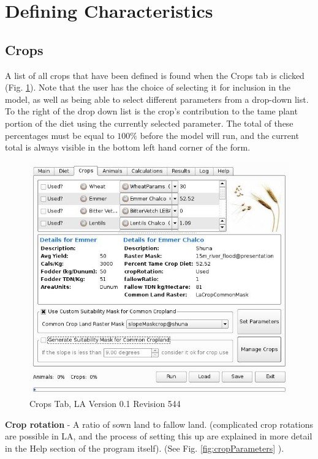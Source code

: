 \section{Defining Characteristics}
 \subsection{Crops}
    A list of all crops that have been defined is found when the Crops tab is
    clicked (Fig. \ref{fig:crop}).  Note that the user has the choice of
    selecting it for inclusion in the model, as well as being able to select
    different parameters from a drop-down list.  To the right of the drop down
    list is the crop's contribution to the tame plant portion of the diet using
    the currently selected parameter.  The total of these percentages must be
    equal to $100\%$ before the model will run, and the current total is always
    visible in the bottom left hand corner of the form.

    \begin{figure}[htbp]
        \includegraphics[scale=.366]{./images/LanduseAnalystCrops546.jpg}
       \caption{\label{fig:crop}Crops Tab, LA Version 0.1 Revision 544}
    \end{figure}

  \textbf{Crop rotation} - A ratio of sown land to fallow land. (complicated
crop
  rotations are possible in LA, and the process of setting this up are
  explained in more detail in the Help section of the program itself). (See Fig.
  \ref{fig:cropParameters} ).

